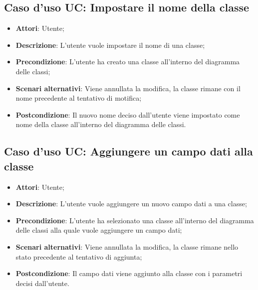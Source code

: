 \documentclass[../AnalisiDeiRequisiti.tex]{subfiles}
\begin{document}
	\subsection{Caso d'uso UC: Impostare il nome della classe}
	\begin{itemize}
		\item \textbf{Attori}: Utente;
		
		\item \textbf{Descrizione}: L'utente vuole impostare il nome di una classe;
		
		\item \textbf{Precondizione}: L'utente ha creato una classe all'interno del diagramma delle classi;
		
		\item \textbf{Scenari alternativi}: Viene annullata la modifica, la classe
		rimane con il nome precedente al tentativo di motifica;
		
		\item \textbf{Postcondizione}: Il nuovo nome deciso dall'utente viene impostato come nome della classe all'interno del diagramma delle classi.
	\end{itemize}
	
	\subsection{Caso d'uso UC: Aggiungere un campo dati alla classe}
	\begin{itemize}
		\item \textbf{Attori}: Utente;
		
		\item \textbf{Descrizione}: L'utente vuole aggiungere un nuovo campo dati a una classe;
		
		\item \textbf{Precondizione}: L'utente ha selezionato una classe all'interno del diagramma delle classi alla quale vuole aggiungere un campo dati;
		
		\item \textbf{Scenari alternativi}: Viene annullata la modifica, la classe
		rimane nello stato precedente al tentativo di aggiunta;
		
		\item \textbf{Postcondizione}: Il campo dati viene aggiunto alla classe con i parametri decisi dall'utente.
	\end{itemize}
	
\end{document}
